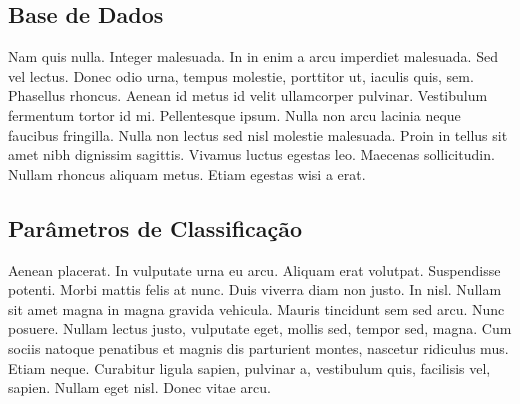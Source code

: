 \subsection{Base de Dados}

Nam quis nulla. Integer malesuada. In in enim a arcu imperdiet malesuada. Sed vel lectus. Donec odio urna, tempus molestie, porttitor ut, iaculis quis, sem. Phasellus rhoncus. Aenean id metus id velit ullamcorper pulvinar. Vestibulum fermentum tortor id mi. Pellentesque ipsum. Nulla non arcu lacinia neque faucibus fringilla. Nulla non lectus sed nisl molestie malesuada. Proin in tellus sit amet nibh dignissim sagittis. Vivamus luctus egestas leo. Maecenas sollicitudin. Nullam rhoncus aliquam metus. Etiam egestas wisi a erat.


\subsection{Parâmetros de Classificação}

Aenean placerat. In vulputate urna eu arcu. Aliquam erat volutpat. Suspendisse potenti. Morbi mattis felis at nunc. Duis viverra diam non justo. In nisl. Nullam sit amet magna in magna gravida vehicula. Mauris tincidunt sem sed arcu. Nunc posuere. Nullam lectus justo, vulputate eget, mollis sed, tempor sed, magna. Cum sociis natoque penatibus et magnis dis parturient montes, nascetur ridiculus mus. Etiam neque. Curabitur ligula sapien, pulvinar a, vestibulum quis, facilisis vel, sapien. Nullam eget nisl. Donec vitae arcu.